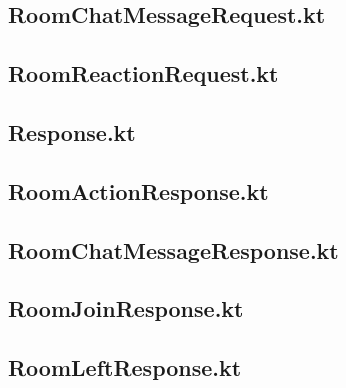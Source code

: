 \documentclass{../includes/TechDoc}
\begin{document}
    \subsection{RoomChatMessageRequest.kt}
    

    \subsection{RoomReactionRequest.kt}
    

    \subsection{Response.kt}
    

    \subsection{RoomActionResponse.kt}
    

    \subsection{RoomChatMessageResponse.kt}
    

    \subsection{RoomJoinResponse.kt}
    

    \subsection{RoomLeftResponse.kt}
    
\end{document}
